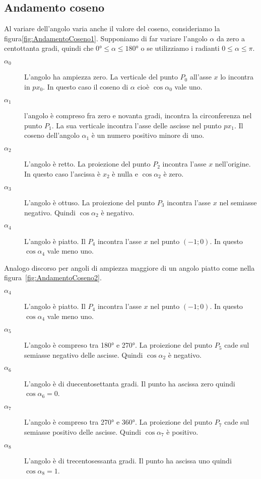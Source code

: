 \subsection{Andamento coseno}
\label{sec:andamentocoseno}
Al variare dell'angolo varia anche il valore del coseno, consideriamo la figura\nobs\vref{fig:AndamentoCoseno1}. Supponiamo di far variare l'angolo $\alpha$ da zero a centottanta gradi, quindi che $\ang{0}\leq\alpha\leq\ang{180}$ o se utilizziamo i radianti $0\leq\alpha\leq\pi$. 
\begin{description}
	\item[$\alpha_0$] L'angolo ha ampiezza zero. La verticale del punto $P_0$ all'asse $x$ lo incontra in $px_0$. In questo caso il coseno di $\alpha$ cioè $\cos\alpha_0$ vale uno.
	\item [$\alpha_1$] l'angolo è compreso fra zero e novanta gradi, incontra la circonferenza nel punto $P_1$. La sua verticale incontra l'asse delle ascisse nel punto $px_1$. Il coseno dell'angolo $\alpha_1$ è un numero positivo minore di uno.
	\item [$\alpha_2$] L'angolo  è retto. La proiezione del punto $P_2$ incontra l'asse $x$ nell'origine. In questo caso l'ascissa è $x_2$ è   nulla e $\cos\alpha_2$ è zero. 
	\item [$\alpha_3$]  L'angolo è ottuso. La proiezione del punto $P_3$ incontra  l'asse $x$ nel semiasse negativo. Quindi $\cos\alpha_2$ è negativo.
	\item [$\alpha_4$] L'angolo  è  piatto. Il  $P_4$ incontra l'asse $x$ nel punto $(-1;0)$. In questo  $\cos\alpha_4$ vale meno uno.
\end{description}
\begin{figure}
	\centering
	
	\label{fig:circonferenzagonimetricagonio}
\end{figure}
Analogo discorso per angoli di ampiezza  maggiore di un angolo  piatto come nella figura~\vref{fig:AndamentoCoseno2}.
\begin{description}
	\item [$\alpha_4$] L'angolo è piatto. Il  $P_4$ incontra l'asse $x$ nel punto $(-1;0)$. In questo  $\cos\alpha_4$ vale meno uno.
	\item [$\alpha_5$] L'angolo è compreso tra \ang{180} e \ang{270}. La proiezione del punto $P_5$ cade sul semiasse negativo delle ascisse. Quindi $\cos\alpha_2$ è negativo.
	\item [$\alpha_6$] L'angolo è di duecentosettanta gradi. Il punto ha ascissa zero quindi  $\cos\alpha_6=0$.
	\item [$\alpha_7$] L'angolo è compreso tra \ang{270} e \ang{360}. La proiezione del punto $P_7$ cade sul semiasse positivo delle ascisse. Quindi $\cos\alpha_7$ è positivo.
	\item [$\alpha_8$] L'angolo è di trecentosessanta gradi. Il punto ha ascissa uno quindi  $\cos\alpha_8=1$.
\end{description}
